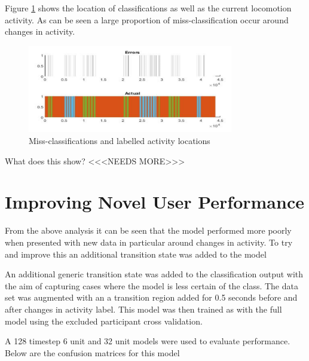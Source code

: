 \documentclass[sensors,article,submit,moreauthors,pdftex]{Definitions/mdpi}
\begin{document}
Figure \ref{fig:missclassification} shows the location of classifications as well as the current locomotion activity. As can be seen a large proportion of miss-classification occur around changes in activity.
\begin{figure}[!htb]
    \centering
    \includegraphics[width=0.8\textwidth]{Figures/results/Screenshot 2020-12-02 130339.png}
    \caption{Miss-classifications and labelled activity locations}
    \label{fig:missclassification}
\end{figure}

What does this show? <<<NEEDS MORE>>>

\section{Improving Novel User Performance}
From the above analysis it can be seen that the model performed more poorly when presented with new data in particular around changes in activity. To try and improve this an additional transition state was added to the model

An additional generic transition state was added to the classification output with the aim of capturing cases where the model is less certain of the class. The data set was augmented with an a transition region added for 0.5 seconds before and after changes in activity label. This model was then trained as with the full model using the excluded participant cross validation.

A 128 timestep 6 unit and 32 unit models were used to evaluate performance. Below are the confusion matrices for this model
\end{document}
